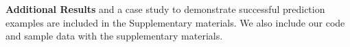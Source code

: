 \documentclass{article}
\begin{document}
{\textbf{Additional Results} and a case study to demonstrate successful prediction examples are included in the Supplementary materials. We also include our code and sample data with the supplementary materials.


}
\end{document}
